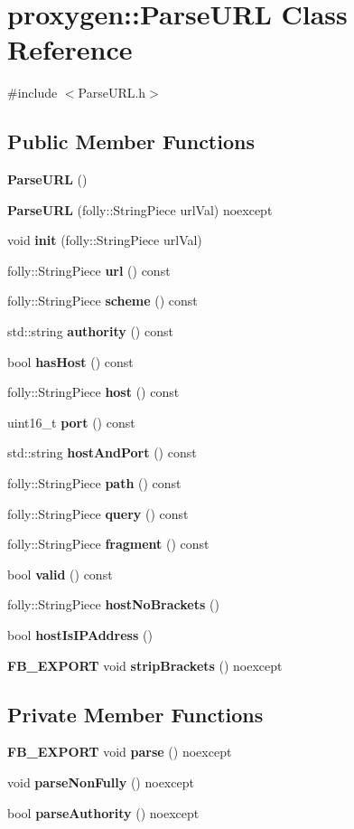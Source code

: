 \section{proxygen\+:\+:Parse\+U\+RL Class Reference}
\label{classproxygen_1_1ParseURL}


{\ttfamily \#include $<$Parse\+U\+R\+L.\+h$>$}

\subsection*{Public Member Functions}
\begin{DoxyCompactItemize}
\item 
{\bf Parse\+U\+RL} ()
\item 
{\bf Parse\+U\+RL} (folly\+::\+String\+Piece url\+Val) noexcept
\item 
void {\bf init} (folly\+::\+String\+Piece url\+Val)
\item 
folly\+::\+String\+Piece {\bf url} () const 
\item 
folly\+::\+String\+Piece {\bf scheme} () const 
\item 
std\+::string {\bf authority} () const 
\item 
bool {\bf has\+Host} () const 
\item 
folly\+::\+String\+Piece {\bf host} () const 
\item 
uint16\+\_\+t {\bf port} () const 
\item 
std\+::string {\bf host\+And\+Port} () const 
\item 
folly\+::\+String\+Piece {\bf path} () const 
\item 
folly\+::\+String\+Piece {\bf query} () const 
\item 
folly\+::\+String\+Piece {\bf fragment} () const 
\item 
bool {\bf valid} () const 
\item 
folly\+::\+String\+Piece {\bf host\+No\+Brackets} ()
\item 
bool {\bf host\+Is\+I\+P\+Address} ()
\item 
{\bf F\+B\+\_\+\+E\+X\+P\+O\+RT} void {\bf strip\+Brackets} () noexcept
\end{DoxyCompactItemize}
\subsection*{Private Member Functions}
\begin{DoxyCompactItemize}
\item 
{\bf F\+B\+\_\+\+E\+X\+P\+O\+RT} void {\bf parse} () noexcept
\item 
void {\bf parse\+Non\+Fully} () noexcept
\item 
bool {\bf parse\+Authority} () noexcept
\end{DoxyCompactItemize}
